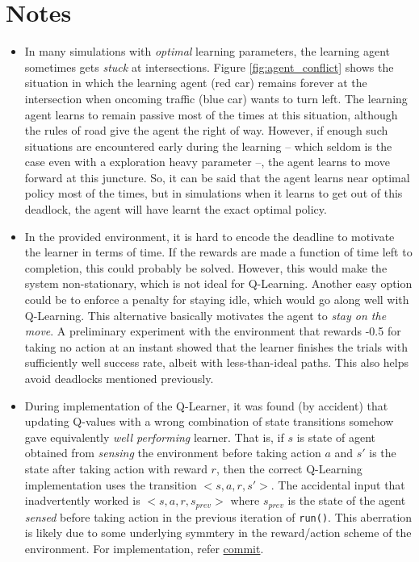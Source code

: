 \documentclass{article}
\begin{document}
	\section{Notes}	\label{notes}
	\begin{itemize}
		\item In many simulations with \emph{optimal} learning parameters, the learning agent sometimes gets \emph{stuck} at intersections. Figure \ref{fig:agent_conflict} shows the situation in which the learning agent (red car) remains forever at the intersection when oncoming traffic (blue car) wants to turn left. The learning agent learns to remain passive most of the times at this situation, although the rules of road give the agent the right of way. However, if enough such situations are encountered early during the learning -- which seldom is the case even with a exploration heavy parameter --, the agent learns to move forward at this juncture. So, it can be said that the agent learns near optimal policy most of the times, but in simulations when it learns to get out of this deadlock, the agent will have learnt the exact optimal policy.
		\item In the provided environment, it is hard to encode the deadline to motivate the learner in terms of time. If the rewards are made a function of time left to completion, this could probably be solved. However, this would make the system non-stationary, which is not ideal for Q-Learning. Another easy option could be to enforce a penalty for staying idle, which would go along well with Q-Learning. This alternative basically motivates the agent to \emph{stay on the move}. A preliminary experiment with the environment that rewards -0.5 for taking no action at an instant showed that the learner finishes the trials with sufficiently well success rate, albeit with less-than-ideal paths. This also helps avoid deadlocks mentioned previously.
		\item During implementation of the Q-Learner, it was found (by accident) that updating Q-values with a wrong combination of state transitions somehow gave equivalently \emph{well performing} learner. That is, if $s$ is state of agent obtained from \emph{sensing} the environment before taking action $a$ and $s\prime$ is the state after taking action with reward $r$, then the correct Q-Learning implementation uses the transition $<s, a, r, s\prime>$. The accidental input that inadvertently worked is $<s, a, r, s_{prev}>$ where $s_{prev}$ is the state of the agent \emph{sensed} before taking action in the previous iteration of \texttt{run()}. This aberration is likely due to some underlying symmtery in the reward/action scheme of the environment. For implementation, refer \href{https://github.com/QuaziRandom/MLND_Project_4/tree/870f14d912e8e9fbec4da7b2008cd2bf522f8b25}{commit}.
	\end{itemize}
\end{document}
